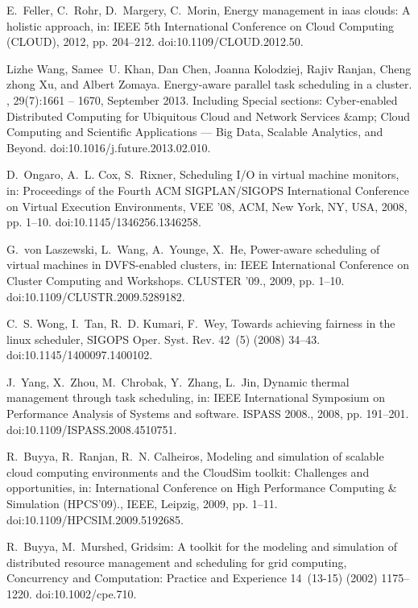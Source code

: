 \documentclass[sort, compress, 5p]{elsarticle}
\begin{document}
\begin{thebibliography}{10}
E.~Feller, C.~Rohr, D.~Margery, C.~Morin, Energy management in iaas clouds: A
  holistic approach, in: IEEE 5th International Conference on Cloud Computing
  (CLOUD), 2012, pp. 204--212.
\newblock doi:10.1109/CLOUD.2012.50.

Lizhe Wang, Samee~U. Khan, Dan Chen, Joanna Kolodziej, Rajiv Ranjan, Cheng
zhong Xu, and Albert Zomaya.
\newblock Energy-aware parallel task scheduling in a cluster.
, 29(7):1661 -- 1670,
September 2013.
\newblock Including Special sections: Cyber-enabled Distributed Computing for
Ubiquitous Cloud and Network Services \&amp; Cloud Computing and Scientific
Applications --- Big Data, Scalable Analytics, and Beyond.
\newblock doi:10.1016/j.future.2013.02.010.

D.~Ongaro, A.~L. Cox, S.~Rixner, Scheduling {I/O} in virtual machine monitors,
  in: Proceedings of the Fourth ACM SIGPLAN/SIGOPS International Conference on
  Virtual Execution Environments, VEE '08, ACM, New York, NY, USA, 2008, pp.
  1--10.
\newblock doi:10.1145/1346256.1346258.

G.~von Laszewski, L.~Wang, A.~Younge, X.~He, Power-aware scheduling of virtual
  machines in {DVFS}-enabled clusters, in: IEEE International Conference on
  Cluster Computing and Workshops. CLUSTER '09., 2009, pp. 1--10.
\newblock doi:10.1109/CLUSTR.2009.5289182.

C.~S. Wong, I.~Tan, R.~D. Kumari, F.~Wey, Towards achieving fairness in the
  linux scheduler, SIGOPS Oper. Syst. Rev. 42~(5) (2008) 34--43.
\newblock doi:10.1145/1400097.1400102.

J.~Yang, X.~Zhou, M.~Chrobak, Y.~Zhang, L.~Jin, Dynamic thermal management
  through task scheduling, in: IEEE International Symposium on Performance
  Analysis of Systems and software. ISPASS 2008., 2008, pp. 191--201.
\newblock doi:10.1109/ISPASS.2008.4510751.

R.~Buyya, R.~Ranjan, R.~N. Calheiros, Modeling and simulation of scalable cloud
  computing environments and the {CloudSim} toolkit: Challenges and
  opportunities, in: International Conference on High Performance Computing \&
  Simulation (HPCS'09)., IEEE, Leipzig, 2009, pp. 1--11.
\newblock doi:10.1109/HPCSIM.2009.5192685.

R.~Buyya, M.~Murshed, Gridsim: A toolkit for the modeling and simulation of
  distributed resource management and scheduling for grid computing,
  Concurrency and Computation: Practice and Experience 14~(13-15) (2002)
  1175--1220.
\newblock doi:10.1002/cpe.710.


\end{thebibliography}
\end{document}
